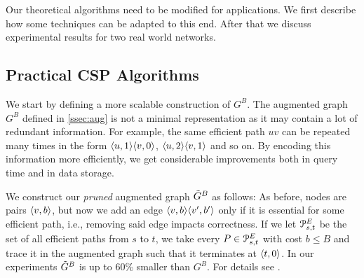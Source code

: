 Our theoretical algorithms need to be modified for applications.
We first describe how some techniques can be adapted to this end.
After that we discuss experimental results for two real world networks. 

\subsection{Practical CSP Algorithms} 
\label{ssec:practical}

We start by defining a more scalable construction of $G^B$.
The augmented graph $G^B$ defined in \cref{ssec:aug} is not a minimal representation as it may contain a lot of redundant information.
For example, the same efficient path $uv$ can be repeated many times in the form $\langle u,1\rangle\langle v,0\rangle$, $\langle u,2\rangle\langle v,1\rangle$ and so on.
By encoding this information more efficiently, we get considerable improvements both in query time and in data storage.

We construct our \emph{pruned} augmented graph $\tilde G^B$ as follows:
As before, nodes are pairs $\langle v,b\rangle$, but now we add an edge $\langle v,b\rangle\langle v',b'\rangle$ only if it is essential for some efficient path, i.e., removing said edge impacts correctness.
If we let $\mathcal{P}_{s,t}^E$ be the set of all efficient paths from $s$ to $t$, we take every $P\in \mathcal{P}_{s,t}^E$ with cost $b\leq B$ and trace it in the augmented graph such that it terminates at $\langle t,0\rangle$.
%
In our experiments $\tilde G^B$ is up to 60\% smaller than $G^B$.
For details see \cite{TechReport}.

